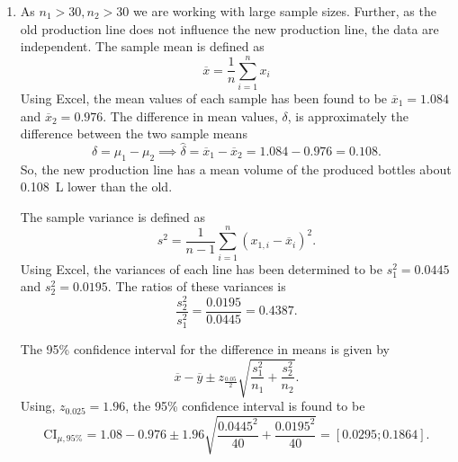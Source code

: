     \begin{derivation}
      \begin{enumerate}[label=\alph*)]
        \item As $n_1 > 30, n_2 > 30$ we are working with large sample sizes.
        Further, as the old production line does not influence the new production line, the data are independent.
        The sample mean is defined as
        \begin{equation*}
          \overline{x} = \frac{1}{n} \sum_{i = 1}^{n} x_i
        \end{equation*}
        Using Excel, the mean values of each sample has been found to be $\overline{x}_1 = \num{1,084}$ and $\overline{x}_2 = \num{0,976}$.
        The difference in mean values, $\delta$, is approximately the difference between the two sample means
        \begin{equation*}
          \delta = \mu_1 - \mu_2 \implies \hat{\delta} = \overline{x}_1 - \overline{x}_2 = \num{1,084}  - \num{0,976}  = \num{0.108}
        .\end{equation*}
        So, the new production line has a mean volume of the produced bottles about \qty{0,108}{\L} lower than the old. 

        The sample variance is defined as
        \begin{equation*}
          s^2 = \frac{1}{n-1} \sum_{i = 1}^{n} \left( x_{1,i} - \overline{x}_{i} \right)^2 
        .\end{equation*}
        Using Excel, the variances of each line has been determined to be $s_1^2 = \num{0,0445}$ and $s_2^2 = \num{0,0195}$.
        The ratios of these variances is
        \begin{equation*}
          \frac{s_2^2}{s_1^2} = \frac{\num{0,0195}}{\num{0,0445}  }   = \num{0.4387}
        .\end{equation*}
        
        The 95\% confidence interval for the difference in means is given by
        \begin{equation*}
          \overline{x} - \overline{y} \pm z_{\frac{\num{0,05} }{2}} \sqrt{\frac{s_1^2}{n_1} + \frac{s_2^2}{n_2}}
        .\end{equation*}
        Using, $z_{\num{0,025}} = \num{1,96}$, the 95\% confidence interval is found to be
        \begin{equation*}
          \text{CI}_{\mu, 95\%} = \num{1,08}  - \num{0,976} \pm \num{1,96} \sqrt{\frac{\num{0,0445}^2}{40} + \frac{\num{0,0195}^2}{40}} = [\num{0,0295}; \num{0,1864}]
        .\end{equation*}


\end{enumerate}
\end{derivation}
